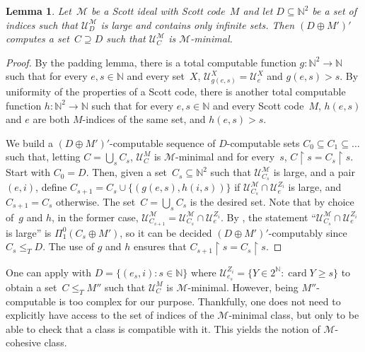 \documentclass{article}
\def\NN{\mathbb{N}}
\def\U{\mathcal{U}}
\def\M{\mathcal{M}}
\newcommand{\cs}{2^{\NN}}
\newcommand{\uh}{\upharpoonright}
\def\qt#1{``#1''}%
\numberwithin{theorem}{section}
\newtheorem{lemma}[theorem]{Lemma}
\theoremstyle{definition}
\begin{document}
\begin{lemma}\label{lem:computation-m-minimal}
Let~$\M$ be a Scott ideal with Scott code~$M$ and let $D \subseteq \NN^2$ be a set of indices such that $\U^\M_D$ is large and contains only infinite sets. Then $(D \oplus M')'$ computes a set~$C \supseteq D$ such that $\U^\M_C$ is $\M$-minimal.
\end{lemma}
\begin{proof}
By the padding lemma, there is a total computable function $g : \NN^2 \to \NN$ such that for every $e, s \in \NN$ and every set~$X$, $\U^X_{g(e, s)} = \U^X_e$ and $g(e,s) > s$. By uniformity of the properties of a Scott code, there is another total computable function $h : \NN^2 \to \NN$ such that for every $e, s \in \NN$ and every Scott code~$M$, $h(e,s)$ and $e$ are both $M$-indices of the same set, and $h(e,s) > s$.

We build a $(D \oplus M')'$-computable sequence of $D$-computable sets $C_0 \subseteq C_1 \subseteq \dots$ such that, letting $C = \bigcup_s C_s$, $\U^M_C$ is $\M$-minimal and for every~$s$, $C \uh s = C_s \uh s$.
Start with $C_0 = D$.
Then, given a set~$C_s \subseteq \NN^2$ such that $\U_{C_s}^\M$ is large, and a pair $(e, i)$, define $C_{s+1} = C_s \cup \{(g(e,s),h(i,s))\}$ if $\U_{C_s}^\M \cap \U_e^{Z_i}$ is large, and $C_{s+1} = C_s$ otherwise. The set~$C = \bigcup_s C_s$ is the desired set. Note that by choice of~$g$ and $h$, in the former case, $\U_{C_{s+1}}^\M = \U_{C_s}^\M \cap \U_e^{Z_i}$.
By , the statement \qt{$\U_{C_s}^\M \cap \U_e^{Z_i}$ is large} is $\Pi^0_1(C_s \oplus M')$, so it can be decided $(D \oplus M')'$-computably since $C_s \leq_T D$. The use of $g$ and $h$ ensures that $C_{s+1} \uh s = C_s \uh s$.
\end{proof}

One can apply  with $D = \{ (e_s, i) : s \in \NN \}$ where $\U_{e_s}^{Z_i} = \{ Y \in \cs : \operatorname{card} Y \geq s \}$ to obtain a set~$C \leq_T M''$ such that $\U^M_C$ is $\M$-minimal.
However, being $M''$-computable is too complex for our purpose. Thankfully, one does not need to explicitly have access to the set of indices of the $\M$-minimal class, but only to be able to check that a class is compatible with it. This yields the notion of $\M$-cohesive class.
\end{document}
